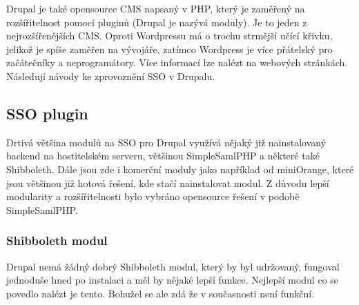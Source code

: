 Drupal je také opensource CMS napsaný v PHP, který je zaměřený na rozšířitelnost pomocí pluginů (Drupal je nazývá moduly). Je to jeden z nejrozšířenějších CMS. Oproti Wordpressu má o trochu strmější učící křivku, jelikož je spíše zaměřen na vývojáře, zatímco Wordpress je více přátelský pro začátečníky a neprogramátory. \cite{drupalvswordpress} 
Více informací lze nalézt na webových stránkách.\cite{drupal}
\\
Následují návody ke zprovoznění SSO v Drupalu.

\subsection{SSO plugin} %
Drtivá většina modulů na SSO pro Drupal využívá nějaký již nainstalovaný backend na hostitelském serveru, většinou SimpleSamlPHP a některé také Shibboleth. Dále jsou zde i komerční moduly jako například od miniOrange\cite{miniorange}, které jsou většinou již hotová řešení, kde stačí nainstalovat modul. Z důvodu lepší modularity a rozšířitelnosti bylo vybráno opensource řešení v podobě SimpleSamlPHP.

\subsubsection{Shibboleth modul} %
    Drupal nemá žádný dobrý Shibboleth modul, který by byl udržovaný, fungoval jednoduše hned po instalaci a měl by nějaké lepší funkce. Nejlepší modul co se povedlo nalézt je tento\cite{basicshib}. Bohužel se ale zdá že v současnosti není funkční.
